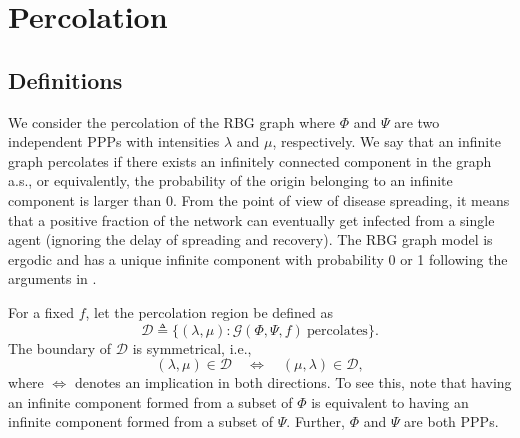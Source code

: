 \section{Percolation}
  
    \subsection{Definitions}
We consider the percolation of the RBG graph where $\Phi$ and $\Psi$ are two independent PPPs with intensities $\lambda$ and $\mu$, respectively. We say that an infinite graph percolates if there exists an infinitely connected component in the graph a.s., or equivalently, the probability of the origin belonging to an infinite component is larger than 0.
 From the point of view of disease spreading, it means that a positive fraction of the network can eventually get infected from a single agent (ignoring the delay of spreading and recovery).  The RBG graph  model is ergodic and has a unique infinite component with probability 0 or 1 following the arguments in \cite[Theorems 2.1\&6.3]{MeesterRonald1996CP}. 
    
    
    
For a fixed $f$, let the percolation region be defined as
\begin{equation}
    \mathcal{D} \triangleq \{(\lambda,\mu): \mathcal{G}\left(\Phi,\Psi, f\right) ~\mathrm{percolates}\}.\nonumber
\end{equation}
   The boundary of $\mathcal{D}$ is  symmetrical, i.e., \[(\lambda,\mu)\in\mathcal{D} \quad \Leftrightarrow \quad (\mu,\lambda)\in\mathcal{D},\]
where $\Leftrightarrow$ denotes an implication in both directions.
    To see this, note that having an infinite component formed from a subset of $\Phi$ is equivalent to having  an infinite component formed from a subset of $\Psi$. Further, $\Phi$ and $\Psi$ are both PPPs.
    
